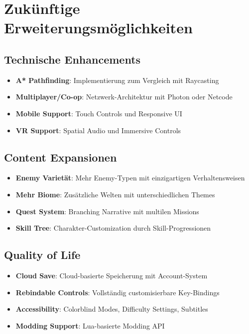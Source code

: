 \documentclass[
  a4paper,
  11pt,
  ngerman,
  parskip=half,
  bibliography=totoc,
  listof=totoc
]{scrreprt}
\begin{document}
\section{Zukünftige Erweiterungsmöglichkeiten}

\subsection{Technische Enhancements}

\begin{itemize}
    \item \textbf{A* Pathfinding}: Implementierung zum Vergleich mit Raycasting
    \item \textbf{Multiplayer/Co-op}: Netzwerk-Architektur mit Photon oder Netcode
    \item \textbf{Mobile Support}: Touch Controls und Responsive UI
    \item \textbf{VR Support}: Spatial Audio und Immersive Controls
\end{itemize}

\subsection{Content Expansionen}

\begin{itemize}
    \item \textbf{Enemy Varietät}: Mehr Enemy-Typen mit einzigartigen Verhaltensweisen
    \item \textbf{Mehr Biome}: Zusätzliche Welten mit unterschiedlichen Themes
    \item \textbf{Quest System}: Branching Narrative mit multilen Missions
    \item \textbf{Skill Tree}: Charakter-Customization durch Skill-Progressionen
\end{itemize}

\subsection{Quality of Life}

\begin{itemize}
    \item \textbf{Cloud Save}: Cloud-basierte Speicherung mit Account-System
    \item \textbf{Rebindable Controls}: Vollständig customisierbare Key-Bindings
    \item \textbf{Accessibility}: Colorblind Modes, Difficulty Settings, Subtitles
    \item \textbf{Modding Support}: Lua-basierte Modding API
\end{itemize}
\end{document}
